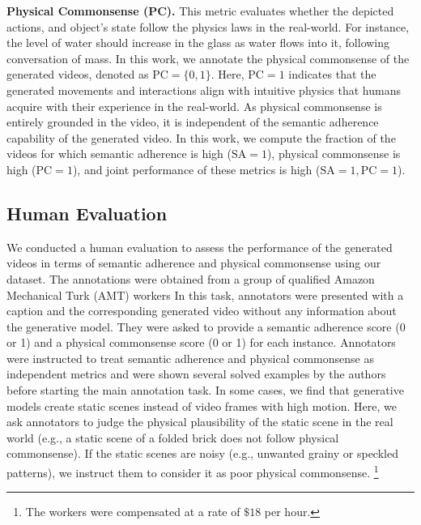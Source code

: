 \textbf{Physical Commonsense (PC).} This metric evaluates whether the depicted actions, and object's state follow the physics laws in the real-world. For instance, the level of water should increase in the glass as water flows into it, following conversation of mass. In this work, we annotate the physical commonsense of the generated videos, denoted as $\text{PC}=\{0,1\}$. Here, $\text{PC}=1$ indicates that the generated movements and interactions align with intuitive physics that humans acquire with their experience in the real-world. As physical commonsense is entirely grounded in the video, it is independent of the semantic adherence capability of the generated video. In this work, we compute the fraction of the videos for which semantic adherence is high ($\text{SA} = 1$), physical commonsense is high ($\text{PC} = 1$), and joint performance of these metrics is high ($\text{SA}=1, \text{PC} = 1$). 

\subsection{Human Evaluation}
\label{sec:human_evaluation}

We conducted a human evaluation to assess the performance of the generated videos in terms of semantic adherence and physical commonsense using our dataset. The annotations were obtained from a group of qualified Amazon Mechanical Turk (AMT) workers  In this task, annotators were presented with a caption and the corresponding generated video without any information about the generative model. They were asked to provide a semantic adherence score (0 or 1) and a physical commonsense score (0 or 1) for each instance. Annotators were instructed to treat semantic adherence and physical commonsense as independent metrics and were shown several solved examples by the authors before starting the main annotation task. In some cases, we find that generative models create static scenes instead of video frames with high motion. Here, we ask annotators to judge the physical plausibility of the static scene in the real world (e.g., a static scene of a folded brick does not follow physical commonsense). If the static scenes are noisy (e.g., unwanted grainy or speckled patterns), we instruct them to consider it as poor physical commonsense. \footnote{The workers were compensated at a rate of $\$18$ per hour.}

